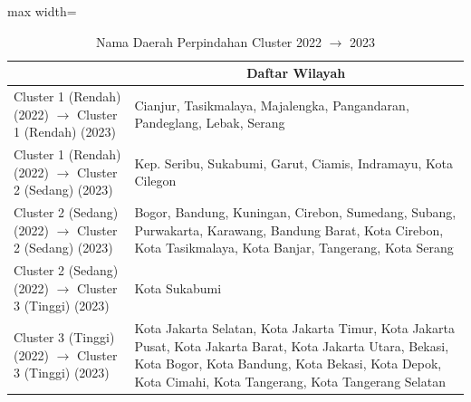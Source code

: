 \begin{table}[H]
\centering
\caption{Nama Daerah Perpindahan Cluster 2022 \(\rightarrow\) 2023} \label{tab:app1transname2022x2023}
\begin{adjustbox}{max width=\textwidth}
\begin{tabular}{|>{\centering\arraybackslash}p{4cm}|p{10cm}|}
\hline
\multicolumn{1}{|c|}{\textbf{Kategori}} & \multicolumn{1}{c|}{\textbf{Daftar Wilayah}} \\
\hline
Cluster 1 (Rendah) (2022) \(\rightarrow\) Cluster 1 (Rendah) (2023) & Cianjur, Tasikmalaya, Majalengka, Pangandaran, Pandeglang, Lebak, Serang \\
\hline
Cluster 1 (Rendah) (2022) \(\rightarrow\) Cluster 2 (Sedang) (2023) & Kep. Seribu, Sukabumi, Garut, Ciamis, Indramayu, Kota Cilegon \\
\hline
Cluster 2 (Sedang) (2022) \(\rightarrow\) Cluster 2 (Sedang) (2023) & Bogor, Bandung, Kuningan, Cirebon, Sumedang, Subang, Purwakarta, Karawang, Bandung Barat, Kota Cirebon, Kota Tasikmalaya, Kota Banjar, Tangerang, Kota Serang \\
\hline
Cluster 2 (Sedang) (2022) \(\rightarrow\) Cluster 3 (Tinggi) (2023) & Kota Sukabumi \\
\hline
Cluster 3 (Tinggi) (2022) \(\rightarrow\) Cluster 3 (Tinggi) (2023) & Kota Jakarta Selatan, Kota Jakarta Timur, Kota Jakarta Pusat, Kota Jakarta Barat, Kota Jakarta Utara, Bekasi, Kota Bogor, Kota Bandung, Kota Bekasi, Kota Depok, Kota Cimahi, Kota Tangerang, Kota Tangerang Selatan \\
\hline
\end{tabular}
\end{adjustbox}
\end{table}